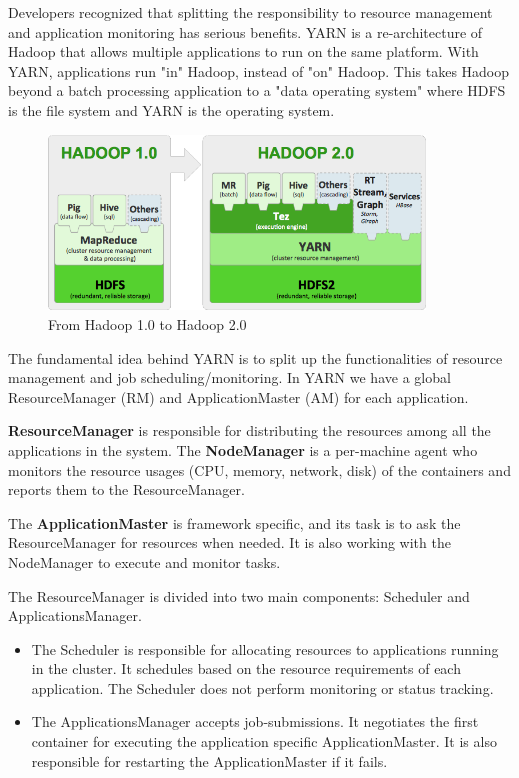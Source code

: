 Developers recognized that splitting the responsibility to resource management and application monitoring has serious benefits. YARN is a re-architecture of Hadoop that allows multiple applications to run on the same platform. With YARN, applications run "in" Hadoop, instead of "on" Hadoop. This takes Hadoop beyond a batch processing application to a "data operating system" where HDFS is the file system and YARN is the operating system. 

\begin{figure}[H]
	\includegraphics[width=100mm, keepaspectratio]{figures/hadoop10vs20.png}
	\centering
	\caption*{From Hadoop 1.0 to Hadoop 2.0}
	\centering
\end{figure}

The fundamental idea behind YARN is to split up the functionalities of resource management and job scheduling/monitoring. In YARN we have a global ResourceManager (RM) and ApplicationMaster (AM) for each application.

\textbf{ResourceManager} is responsible for distributing the resources among all the applications in the system. The \textbf{NodeManager} is a per-machine agent who monitors the resource usages (CPU, memory, network, disk) of the containers and reports them to the ResourceManager. 

The \textbf{ApplicationMaster} is framework specific, and its task is to ask the ResourceManager for resources when needed. It is also working with the NodeManager to execute and monitor tasks.

The ResourceManager is divided into two main components: Scheduler and ApplicationsManager.
\begin{itemize}
	\item The Scheduler is responsible for allocating resources to applications running in the cluster. It schedules based on the resource requirements of each application. The Scheduler does not perform monitoring or status tracking.
	\item The ApplicationsManager accepts job-submissions. It negotiates the first container for executing the application specific ApplicationMaster. It is also responsible for restarting the ApplicationMaster if it fails. 
\end{itemize}

